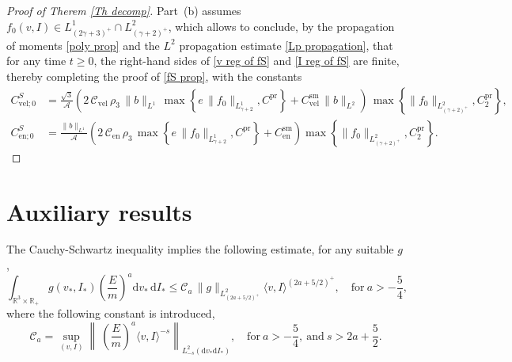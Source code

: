 \documentclass[11pt,a4paper]{amsart}
\newcommand{\bRp}{\mathbb{R}_+}
\newcommand{\bRfp}{\mathbb{R}^3 \times \bRp}
\newcommand{\md}{\mathrm{d}}
\newcommand{\g}{\gamma}
\newcommand{\la}{\langle}
\newcommand{\ra}{\rangle}
\newcommand{\Ls}{L^1}
\newcommand{\E}{\left(\frac{E}{m}\right)}
\newcommand{\cb}{\mathcal{C}}
\newcommand{\mA}{\mathcal{A}}
\newcommand{\Csvel}{C_{\text{vel}}^{\text{sm}}}
\newcommand{\Csen}{C_{\text{en}}^{\text{sm}}}
\newcommand{\CvelzS}{C_{\text{vel};0}^{S}}
\newcommand{\CenzS}{C_{\text{en};0}^{S}}
\newcommand{\Clvel}{\mathcal{C}_{\text{vel}}}
\newcommand{\Clen}{\mathcal{C}_{\text{en}}}
\newcommand{\Cpr}{C^{\text{pr}}}
\begin{document}
\begin{proof}[Proof of Therem \ref{Th decomp}]
Part~(b) assumes $f_0(v,I) \in L^1_{(2\gamma+3)^+} \cap L^2_{(\gamma+2)^+}$, which allows   to conclude, by the propagation of moments \eqref{poly prop} and the $L^2$ propagation estimate \eqref{Lp propagation}, that for any time $t \geq 0$, the right-hand sides of \eqref{v reg of fS} and \eqref{I reg of fS} are finite, 
thereby completing the proof of \eqref{fS prop}, with the constants
\begin{equation*}
	\begin{split}
	\CvelzS & = \frac{\sqrt{3}}{\mA} \left( 2  \, \Clvel  \,  \rho_3 \,  	\| b \|_{\Ls}\, \max \left\{  e \,	\| f_0 \|_{L^1_{\g+2}}, \Cpr \right\} +   \Csvel \, \|b\|_{L^{2}} \right)\, \max\left\{  \| f_0    \|_{L^2_{(\gamma+2)^+}}, \Cpr_2 \right\}, \\
	\CenzS & = \frac{	\| b \|_{\Ls} }{\mA}  \left(    2 \, \Clen \, \rho_3 \,      \max \left\{  e \,	\| f_0 \|_{L^1_{\g+2}}, \Cpr \right\}  +   \Csen \right)  \max\left\{  \| f_0    \|_{L^2_{(\gamma+2)^+}}, \Cpr_2 \right\}.
	\end{split}
\end{equation*}


 
\end{proof}
  
 
 
\appendix

\section{Auxiliary results}

The  Cauchy-Schwartz inequality implies the following estimate, for any suitable $g$,
\begin{equation}\label{constant Ca estimate}
	\int_{\bRfp} g(v_*,I_*)   \E^{a} \md v_* \, \md I_* \leq \cb_a \,  \| g\|_{L^2_{\left(2 a + {5}/{2}\right)^+}} \la v, I \ra^{\left(2 a + {5}/{2}\right)^+}, \quad \text{for} \ a>-\frac{5}{4},
\end{equation}
where the following  constant is introduced,
\begin{equation}\label{constant Ca}
	\mathcal{C}_a =	 \sup_{(v,I)}  \left\| \    \E^{a} \la v, I \ra^{-s}  \right\|_{L^2_{-s}(\md v_* \md I_*)}, \quad \text{for} \ a>-\frac{5}{4}, \ \text{and} \ s> 2 a + \frac{5}{2}.
\end{equation}
 
\end{document}
